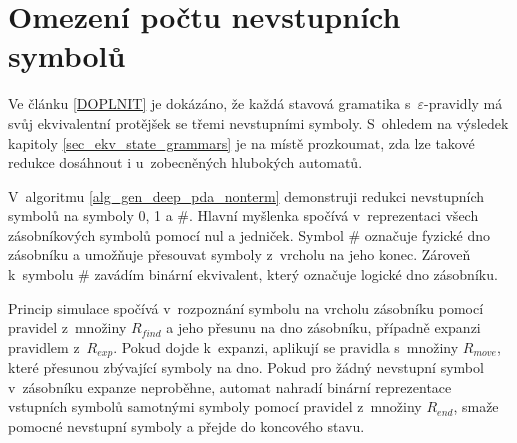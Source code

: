\section{Omezení počtu nevstupních symbolů}


Ve článku \ref{DOPLNIT} je dokázáno, že každá stavová gramatika s~$\varepsilon$-pravidly má svůj ekvivalentní protějšek se třemi nevstupními symboly. S~ohledem na výsledek kapitoly \ref{sec_ekv_state_grammars} je na místě prozkoumat, zda lze takové redukce dosáhnout i u~zobecněných hlubokých automatů.

V~algoritmu \ref{alg_gen_deep_pda_nonterm} demonstruji redukci nevstupních symbolů na symboly 0, 1 a \#. Hlavní myšlenka spočívá v~reprezentaci všech zásobníkových symbolů pomocí nul a jedniček. Symbol \# označuje fyzické dno zásobníku a umožňuje přesouvat symboly z~vrcholu na jeho konec. Zároveň k~symbolu \# zavádím binární ekvivalent, který označuje logické dno zásobníku. 

Princip simulace spočívá v~rozpoznání symbolu na vrcholu zásobníku pomocí pravidel z~množiny $R_{find}$ a jeho přesunu na dno zásobníku, případně expanzi pravidlem z~$R_{exp}$. Pokud dojde k~expanzi, aplikují se pravidla s~množiny $R_{move}$, které přesunou zbývající symboly na dno. Pokud pro žádný nevstupní symbol v~zásobníku expanze neproběhne, automat nahradí binární reprezentace vstupních symbolů samotnými symboly pomocí pravidel z~množiny $R_{end}$, smaže pomocné nevstupní symboly a přejde do koncového stavu.


